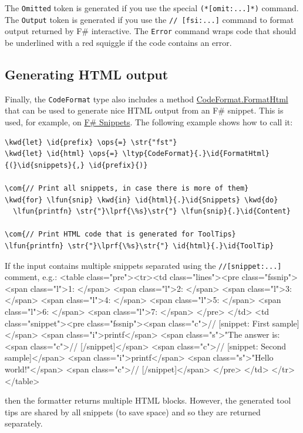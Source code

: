 \documentclass{article}
\newcommand{\id}[1]{\textcolor{black}{#1}}
\newcommand{\com}[1]{\textcolor{officegreen}{#1}}
\newcommand{\kwd}[1]{\textcolor{navy}{#1}}
\newcommand{\ops}[1]{\textcolor{purple}{#1}}
\newcommand{\str}[1]{\textcolor{olive}{#1}}
\begin{document}
The \texttt{Omitted} token is generated if you use the special \texttt{(*[omit:...]*)} command.
The \texttt{Output} token is generated if you use the \texttt{// [fsi:...]} command to format
output returned by F\# interactive. The \texttt{Error} command wraps code that should be
underlined with a red squiggle if the code contains an error.
\subsection*{Generating HTML output}



Finally, the \texttt{CodeFormat} type also includes a method \href{https://fsprojects.github.io/FSharp.Formatting/reference/fsharp-formatting-codeformat-codeformat.html}{CodeFormat.FormatHtml} that can be used
to generate nice HTML output from an F\# snippet. This is used, for example, on
\href{http://www.fssnip.net}{F\# Snippets}. The following example shows how to call it:
\begin{Verbatim}[commandchars=\\\{\}]
\kwd{let} \id{prefix} \ops{=} \str{"fst"}
\kwd{let} \id{html} \ops{=} \ltyp{CodeFormat}{.}\id{FormatHtml}{(}\id{snippets}{,} \id{prefix}{)}

\com{// Print all snippets, in case there is more of them}
\kwd{for} \lfun{snip} \kwd{in} \id{html}{.}\id{Snippets} \kwd{do}
  \lfun{printfn} \str{"}\lprf{\%s}\str{"} \lfun{snip}{.}\id{Content}

\com{// Print HTML code that is generated for ToolTips}
\lfun{printfn} \str{"}\lprf{\%s}\str{"} \id{html}{.}\id{ToolTip}
\end{Verbatim}



If the input contains multiple snippets separated using the \texttt{//[snippet:...]} comment, e.g.:
<table class="pre"><tr><td class="lines"><pre class="fssnip">
<span class="l">1: </span>
<span class="l">2: </span>
<span class="l">3: </span>
<span class="l">4: </span>
<span class="l">5: </span>
<span class="l">6: </span>
<span class="l">7: </span>
</pre>
</td>
<td class="snippet"><pre class="fssnip"><span class="c">// [snippet: First sample]</span>
<span class="i">printf</span> <span class="s">"The answer is: %
<span class="c">// [/snippet]</span>
<span class="c">// [snippet: Second sample]</span>
<span class="i">printf</span> <span class="s">"Hello world!"</span>
<span class="c">// [/snippet]</span>
</pre>
</td>
</tr>
</table>


then the formatter returns multiple HTML blocks. However, the generated tool tips
are shared by all snippets (to save space) and so they are returned separately.
\end{document}
